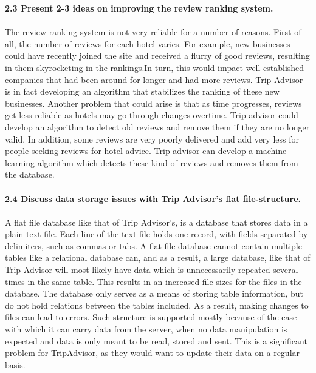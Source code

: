 \documentclass{article}
\begin{document}
\noindent \textbf{2.3 Present 2-3 ideas on improving the review ranking system.}
\\ \\The review ranking system is not very reliable for a number of reasons. First of all, the number of reviews for each hotel varies. For example, new businesses could have recently joined the site and received a flurry of good reviews, resulting in them skyrocketing in the rankings.In turn, this would impact well-established companies that had been around for longer and had more reviews. Trip Advisor is in fact developing an algorithm that stabilizes the ranking of these new businesses. Another problem that could arise is that as time progresses, reviews get less reliable as hotels may go through changes overtime. Trip advisor could develop an algorithm to detect old reviews and remove them if they are no longer valid. In addition, some reviews are very poorly delivered and add very less for people seeking reviews for hotel advice. Trip advisor can develop a machine-learning algorithm which detects these kind of reviews and removes them from the database. \\ \\

\noindent \textbf{2.4 Discuss data storage issues with Trip Advisor's flat file-structure.}
\\ \\A flat file database like that of Trip Advisor's, is a database that stores data in a plain text file. Each line of the text file holds one record, with fields separated by delimiters, such as commas or tabs. A flat file database cannot contain multiple tables like a relational database can, and as a result, a large database, like that of Trip Advisor will most likely have data which is unnecessarily repeated several times in the same table. This results in an increased file sizes for the files in the database. The database only serves as a means of storing table information, but do not hold relations between the tables included. As a result, making changes to files can lead to errors. Such structure is supported mostly because of the ease with which it can carry data from the server, when no data manipulation is expected and data is only meant to be read, stored and sent. This is a significant problem for TripAdvisor, as they would want to update their data on a regular basis.
\end{document}

